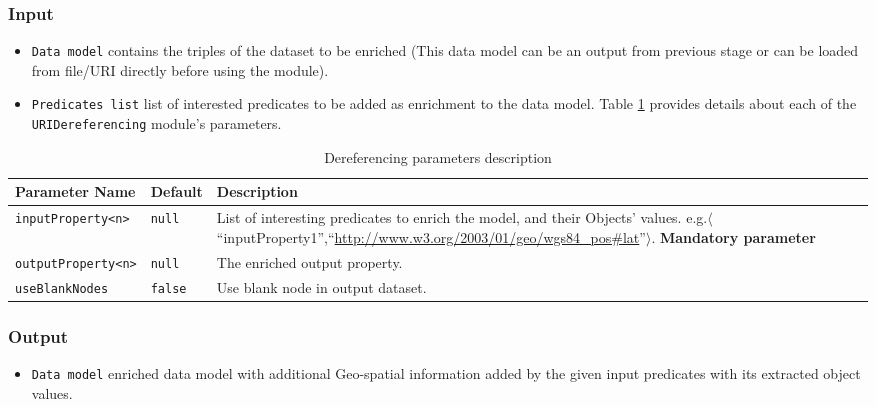 \documentclass[a4paper,twoside,bibtotoc,abstracton,12pt,BCOR=15mm]{article}
\begin{document}
\subsubsection{Input}
\begin{itemize}
 \item \texttt{Data model} contains the triples of the dataset to be enriched 
 (This data model can be an output from previous stage or can be loaded from file/URI directly before using the module). 
 \item \texttt{Predicates list} list of interested predicates to be added as enrichment to the data model.
 Table \ref{tbl:derefPram} provides details about each of the \texttt{URIDereferencing} module's parameters.
\end{itemize}



\begin{table}[ht]
\caption{Dereferencing parameters description} \label{tbl:derefPram}
\begin{tabularx}{\textwidth}{@{}llX@{}}
\toprule
\textbf{Parameter Name} & \textbf{Default} & \textbf{Description}\\
\midrule
\texttt{inputProperty<n>} 	& \texttt{null} 	& List of interesting predicates to enrich the model, and their Objects' values. e.g.$\langle$``inputProperty1'',``\url{http://www.w3.org/2003/01/geo/wgs84_pos#lat}''$\rangle$. \textbf{Mandatory parameter}\\
\midrule
\texttt{outputProperty<n>} 	& \texttt{null} 	& The enriched output property.\\
\midrule
\texttt{useBlankNodes}		& \texttt{false} & Use blank node in output dataset.\\
\bottomrule
\end{tabularx}
\end{table}

\subsubsection{Output}
\begin{itemize}
 \item \texttt{Data model} enriched data model with additional Geo-spatial information added by the given input predicates with its extracted object values.
\end{itemize}
\end{document}
